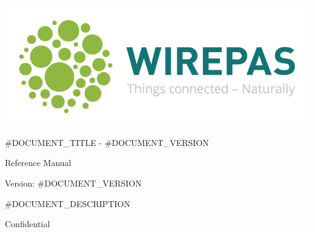 \documentclass[a4paper]{article}
\newcommand{\docclass}{Reference Manual}
\newcommand{\docstatus}{Confidential}
\newcommand{\vnum}{#DOCUMENT_VERSION}
\newcommand{\mytitle}{#DOCUMENT_TITLE - \vnum}
\begin{document}
\thispagestyle{empty}

\vspace*{2cm}
\includegraphics[width=\linewidth]{wm-logo.png}

\vspace*{2.5cm}

\begin{LARGE}
\mytitle
\end{LARGE}

\vspace*{2.5cm}

\begin{Large}
\docclass
\end{Large}

\vspace*{1cm}

Version: \vnum

#DOCUMENT_DESCRIPTION

\vspace*{2.5cm}

\begin{Huge}
\docstatus
\end{Huge}

\newpage

\tableofcontents

\newpage

\end{document}

